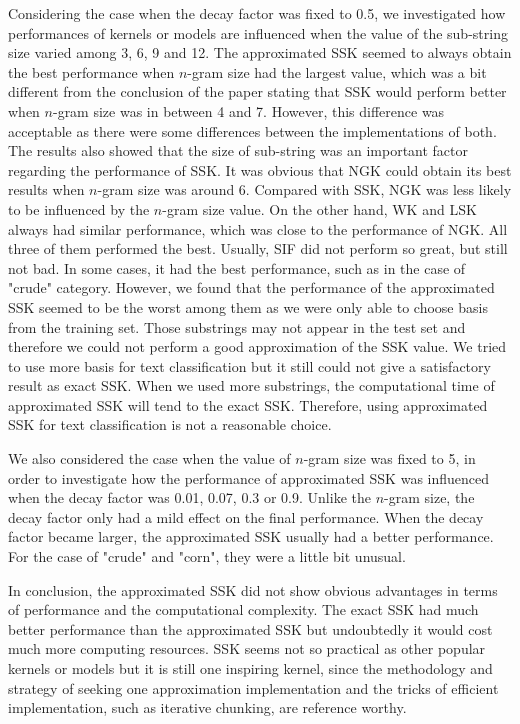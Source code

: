 \documentclass{article}
\begin{document}
Considering the case when the decay factor was fixed to 0.5, we investigated how performances of kernels or models are influenced when the value of the sub-string size varied among 3, 6, 9 and 12. The approximated SSK seemed to always obtain the best performance when $n$-gram size had the largest value, which was a bit different from the conclusion of the paper stating that SSK would perform better when $n$-gram size was in between 4 and 7. However, this difference was acceptable as there were some differences between the implementations of both. The results also showed that the size of sub-string was an important factor regarding the performance of SSK. It was obvious that NGK could obtain its best results when $n$-gram size was around 6. Compared with SSK, NGK was less likely to be influenced by the $n$-gram size value. On the other hand, WK and LSK always had similar performance, which was close to the performance of NGK. All three of them performed the best. Usually, SIF did not perform so great, but still not bad. In some cases, it had the best performance, such as in the case of "crude" category. However, we found that the performance of the approximated SSK seemed to be the worst among them as we were only able to choose basis from the training set. Those substrings may not appear in the test set and therefore we could not perform a good approximation of the SSK value. We tried to use more basis for text classification but it still could not give a satisfactory result as exact SSK. When we used more substrings, the computational time of approximated SSK will tend to the exact SSK. Therefore, using approximated SSK for text classification is not a reasonable choice.

We also considered the case when the value of $n$-gram size was fixed to 5, in order to investigate how the performance of approximated SSK was influenced when the decay factor was 0.01, 0.07, 0.3 or 0.9. Unlike the $n$-gram size, the decay factor only had a mild effect on the final performance. When the decay factor became larger, the approximated SSK usually had a better performance. For the case of "crude" and "corn", they were a little bit unusual.

In conclusion, the approximated SSK did not show obvious advantages in terms of performance and the computational complexity. The exact SSK had much better performance than the approximated SSK but undoubtedly it would cost much more computing resources. SSK seems not so practical as other popular kernels or models but it is still one inspiring kernel, since the methodology and strategy of seeking one approximation implementation and the tricks of efficient implementation, such as iterative chunking, are reference worthy.
\end{document}

